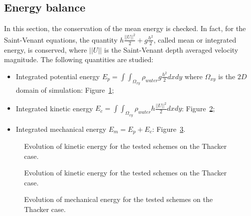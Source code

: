 \subsection{Energy balance}

In this section, the conservation of the mean energy is checked. In fact, for the Saint-Venant equations,
the quantity $h \frac{||U||^2}{2} + g \frac{h^2}{2}$, called mean or integrated energy, is conserved,
where $||U||$ is the Saint-Venant depth averaged velocity magnitude.
The following quantities are studied:
\begin{itemize}
\item Integrated potential energy \textbf{$E_p =\int\int_{\Omega_{xy}}\rho_{water} g \frac{h^2}{2} dxdy$} where $\Omega_{xy}$ is the $2D$ domain of simulation: Figure~\ref{fig:thacker:Ep};
\item Integrated kinetic energy \textbf{$E_c =\int\int_{\Omega_{xy}} \rho_{water} h \frac{||U||^2}{2} dxdy$}: Figure~\ref{fig:thacker:Ec};
\item Integrated mechanical energy \textbf{$E_m = E_p + E_c$}: Figure~\ref{fig:thacker:Em}.
\end{itemize}

\begin{figure}[H]
\centering
  \caption{Evolution of kinetic energy for the tested schemes on the Thacker case.}
\label{fig:thacker:Ep}
\end{figure}

\begin{figure}[H]
\centering
  \caption{Evolution of kinetic energy for the tested schemes on the Thacker case.}
\label{fig:thacker:Ec}
\end{figure}

\begin{figure}[H]
\centering
  \caption{Evolution of mechanical energy for the tested schemes on the Thacker case.}
\label{fig:thacker:Em}
\end{figure}

